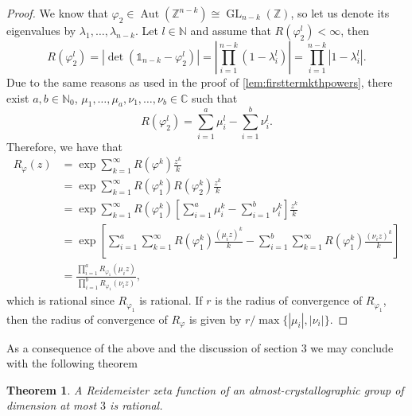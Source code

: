 \documentclass[a4paper]{article}
\theoremstyle{plain}
\newtheorem{theorem}{Theorem}[section]
\theoremstyle{definition}
\theoremstyle{remark}
\DeclareMathOperator{\Aut}{Aut}
\DeclareMathOperator{\GL}{GL}
\newcommand{\I}{\mathds{1}}
\newcommand{\NN}{{\mathbb{N}}}
\newcommand{\ZZ}{{\mathbb{Z}}}
\newcommand{\CC}{{\mathbb{C}}}
\begin{document}
\begin{proof}
We know that \(\varphi_2 \in \Aut(\ZZ^{n-k}) \cong \GL_{n-k}(\ZZ)\), so let us denote its eigenvalues by \(\lambda_1, \dots, \lambda_{n-k}\). Let \(l \in \NN\) and assume that \(R(\varphi_2^l) < \infty\), then
\begin{equation*}
R(\varphi_2^l) = \left|\det\left(\I_{n-k}-\varphi_2^l\right)\right| = \left|\prod_{i=1}^{n-k} (1-\lambda_i^l) \right| = \prod_{i=1}^{n-k}|1-\lambda_i^l|.
\end{equation*}
Due to the same reasons as used in the proof of \cref{lem:firsttermkthpowers}, there exist \(a,b \in \NN_0\), \(\mu_1, \dots, \mu_a, \nu_1, \dots, \nu_b \in \CC\) such that
\begin{equation*}
R(\varphi_2^l) = \sum_{i=1}^a  \mu_i^l - \sum_{i=1}^b \nu_i^l.
\end{equation*}
Therefore, we have that
\begin{align*}
R_\varphi(z) &= \exp \sum_{k=1}^\infty R(\varphi^k) \frac{z^k}{k}\\
&= \exp \sum_{k=1}^\infty  R(\varphi_1^k)R(\varphi_2^k) \frac{z^k}{k}\\
&=  \exp \sum_{k=1}^\infty  R(\varphi_1^k) \left[\sum_{i=1}^a  \mu_i^k - \sum_{i=1}^b \nu_i^k\right]\frac{z^k}{k}\\
&= \exp  \left[\sum_{i=1}^a\sum_{k=1}^\infty R(\varphi_1^k) \frac{(\mu_iz)^k}{k}  -\sum_{i=1}^b \sum_{k=1}^\infty R(\varphi_1^k) \frac{(\nu_iz)^k}{k} \right]\\
&= \frac{\prod_{i=1}^a R_{\varphi_1}(\mu_iz)}{\prod_{i=1}^b R_{\varphi_1}(\nu_iz)},
\end{align*}
which is rational since \(R_{\varphi_1}\) is rational. If \(r\) is the radius of convergence of  \(R_{\varphi_1}\), then the radius of convergence of \(R_\varphi\) is given by \(r / \max \{|\mu_i|, |\nu_i|\}\).
\end{proof}

As a consequence of the above and the discussion of section 3 we may conclude with the following  theorem


\begin{theorem}
	A Reidemeister zeta function of an almost-crystallographic group of dimension at most \(3\) is rational.
\end{theorem}
%
%
\printbibliography
\end{document}
